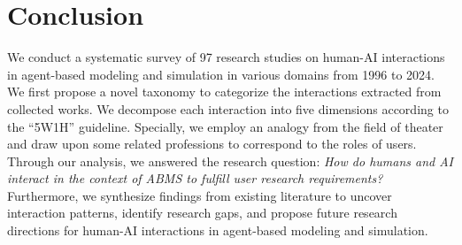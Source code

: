 
\section{Conclusion}
We conduct a systematic survey of 97 research studies on human-AI interactions in agent-based modeling and simulation in various domains from 1996 to 2024.
We first propose a novel taxonomy to categorize the interactions extracted from collected works.
We decompose each interaction into five dimensions according to the ``5W1H'' guideline.
Specially, we employ an analogy from the field of theater and draw upon some related professions to correspond to the roles of users.
Through our analysis, we answered the research question: \textit{How do humans and AI interact in the context of ABMS to fulfill user research requirements?}
Furthermore, we synthesize findings from existing literature to uncover interaction patterns, identify research gaps, and propose future research directions for human-AI interactions in agent-based modeling and simulation.